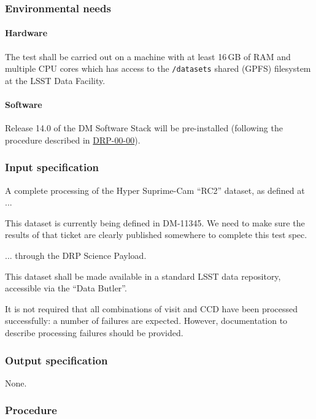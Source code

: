 \subsubsection{Environmental needs}

\paragraph{Hardware}

The test shall be carried out on a machine with at least 16\,GB of RAM and
multiple CPU cores which has access to the \texttt{/datasets} shared (GPFS)
filesystem at the LSST Data Facility.

\paragraph{Software}

Release 14.0 of the DM Software Stack will be pre-installed (following the
procedure described in \hyperref[drp-00-00]{DRP-00-00}).

\subsubsection{Input specification}

A complete processing of the Hyper Suprime-Cam ``RC2'' dataset, as defined
at ...

\begin{note}
This dataset is currently being defined in DM-11345. We need to make sure the
results of that ticket are clearly published somewhere to complete this test
spec.

\end{note}

... through the DRP Science Payload.

This dataset shall be made available in a standard LSST data repository,
accessible via the ``Data Butler''.

It is not required that all combinations of visit and CCD have been processed
successfully: a number of failures are expected. However, documentation to
describe processing failures should be provided.

\subsubsection{Output specification}

None.

\subsubsection{Procedure}


